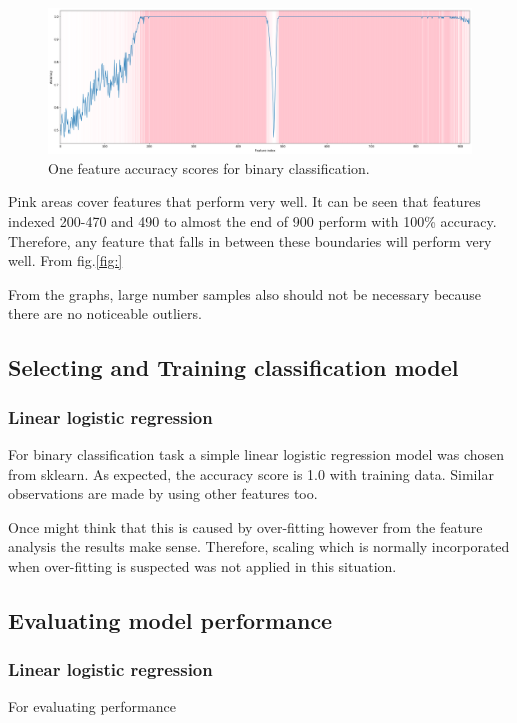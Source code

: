 \documentclass[11pt]{article}
\begin{document}
		\begin{figure}[H]
			\includegraphics[width=1\textwidth]{png/binary_one}
			\caption{One feature accuracy scores for binary classification.}
			\label{fig:binary_one}
		\end{figure}

		Pink areas cover features that perform very well. It can be seen that features indexed 200-470 and 490 to almost the end of 900 perform with 100\% accuracy. Therefore, any feature that falls in between these boundaries will perform very well. From fig.\ref{fig:}

		From the graphs, large number samples also should not be necessary because there are no noticeable outliers. 

	\subsection{Selecting and Training classification model}
		\subsubsection{Linear logistic regression}
			For binary classification task a simple linear logistic regression model was chosen from sklearn. As expected, the accuracy score is 1.0 with training data. Similar observations are made by using other features too. 

			Once might think that this is caused by over-fitting however from the feature analysis the results make sense. Therefore, scaling which is normally incorporated when over-fitting is suspected was not applied in this situation. 

	\subsection{Evaluating model performance}
		\subsubsection{Linear logistic regression}
			For evaluating performance  
\end{document}
